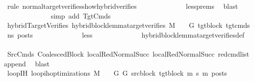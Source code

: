 \begin{isabellebody}
\ {\isacharparenleft}{\kern0pt}rule\ normal{\isacharunderscore}{\kern0pt}target{\isacharunderscore}{\kern0pt}verifies{\isacharunderscore}{\kern0pt}show{\isacharunderscore}{\kern0pt}hybrid{\isacharunderscore}{\kern0pt}verifies{\isacharparenright}{\kern0pt}\isanewline
\ \ \ \ \ \ \ \ \ \ \ \ \isamarkupfalse%
\ less{\isachardot}{\kern0pt}prems{\isacharparenleft}{\kern0pt}{}{\isacharparenright}{\kern0pt}\ \isamarkupfalse%
\ blast\isanewline
\ \ \ \ \ \ \ \ \ \ \ \ \isamarkupfalse%
\ {\isacharparenleft}{\kern0pt}simp\ add{\isacharcolon}{\kern0pt}\ TgtCmds{\isacharparenright}{\kern0pt}\isanewline
\isanewline
\ \ \ \ \ \ \ \ \ \ \isamarkupfalse%
\ hybridTargetVerifies{\isacharcolon}{\kern0pt}\ {\isachardoublequoteopen}hybrid{\isacharunderscore}{\kern0pt}block{\isacharunderscore}{\kern0pt}lemma{\isacharunderscore}{\kern0pt}target{\isacharunderscore}{\kern0pt}verifies\ M\ {\isasymLambda}\ {\isasymGamma}\ {\isasymOmega}\ G{\isacharprime}{\kern0pt}\ tgt{\isacharunderscore}{\kern0pt}block\ tgt{\isacharunderscore}{\kern0pt}cmds{\isacharunderscore}{\kern0pt}{}\ ns{\isacharprime}{\kern0pt}\ posts{\isachardoublequoteclose}\isanewline
\ \ \ \ \ \ \ \ \ \ \ \ \isamarkupfalse%
\ less{\isacharparenleft}{\kern0pt}{}{\isacharparenright}{\kern0pt}\isanewline
\ \ \ \ \ \ \ \ \ \ \ \ \isamarkupfalse%
\ hybrid{\isacharunderscore}{\kern0pt}block{\isacharunderscore}{\kern0pt}lemma{\isacharunderscore}{\kern0pt}target{\isacharunderscore}{\kern0pt}verifies{\isacharunderscore}{\kern0pt}def\isanewline
\ \ \ \ \ \ \ \ \ \ \ \ \isamarkupfalse%
\ SrcCmds\ CoalescedBlock\ local{\isachardot}{\kern0pt}RedNormalSucc{\isacharparenleft}{\kern0pt}{}{\isacharparenright}{\kern0pt}\ local{\isachardot}{\kern0pt}RedNormalSucc{\isacharparenleft}{\kern0pt}{}{\isacharparenright}{\kern0pt}\ red{\isacharunderscore}{\kern0pt}cmd{\isacharunderscore}{\kern0pt}list{\isacharunderscore}{\kern0pt}append\ \isamarkupfalse%
\ blast\isanewline
\ \ \ \ \ \ \ \ \ \ \isamarkupfalse%
\ loopIH{\isacharcolon}{\kern0pt}\ {\isachardoublequoteopen}loop{\isacharunderscore}{\kern0pt}ih{\isacharunderscore}{\kern0pt}optimizations\ M\ {\isasymLambda}\ {\isasymGamma}\ {\isasymOmega}\ G\ G{\isacharprime}{\kern0pt}\ src{\isacharunderscore}{\kern0pt}block\ tgt{\isacharunderscore}{\kern0pt}block\ m{\isacharprime}{\kern0pt}\ s{\isacharprime}{\kern0pt}\ m\ posts{\isachardoublequoteclose}\isanewline

\end{isabellebody}
